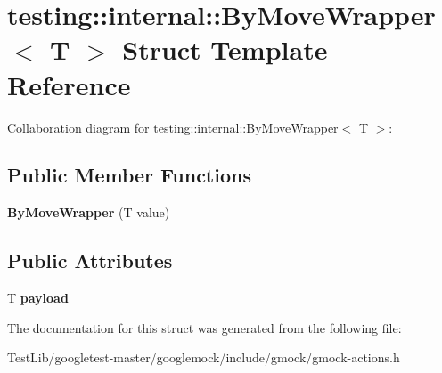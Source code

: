 \hypertarget{structtesting_1_1internal_1_1ByMoveWrapper}{}\section{testing\+:\+:internal\+:\+:By\+Move\+Wrapper$<$ T $>$ Struct Template Reference}
\label{structtesting_1_1internal_1_1ByMoveWrapper}


Collaboration diagram for testing\+:\+:internal\+:\+:By\+Move\+Wrapper$<$ T $>$\+:
\subsection*{Public Member Functions}
\begin{DoxyCompactItemize}
\item 
\mbox{\label{structtesting_1_1internal_1_1ByMoveWrapper_a60df33395785e0bfc5f72fba32376349}} 
{\bfseries By\+Move\+Wrapper} (T value)
\end{DoxyCompactItemize}
\subsection*{Public Attributes}
\begin{DoxyCompactItemize}
\item 
\mbox{\label{structtesting_1_1internal_1_1ByMoveWrapper_ae8407b1ae99db3f00797d68b9ee9e870}} 
T {\bfseries payload}
\end{DoxyCompactItemize}


The documentation for this struct was generated from the following file\+:\begin{DoxyCompactItemize}
\item 
Test\+Lib/googletest-\/master/googlemock/include/gmock/gmock-\/actions.\+h\end{DoxyCompactItemize}
